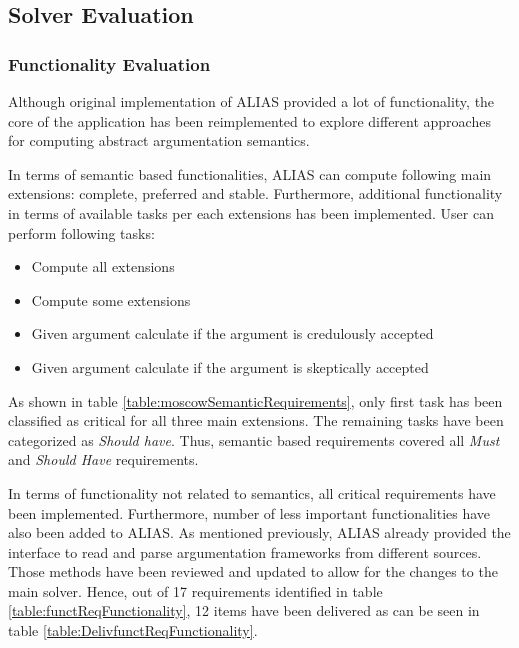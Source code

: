 \subsection{Solver Evaluation}

\subsubsection{Functionality Evaluation}
Although original implementation of ALIAS provided a lot of functionality, the core of the application has been reimplemented to explore different approaches for computing abstract argumentation semantics. 

In terms of semantic based functionalities, ALIAS can compute following main extensions: complete, preferred and stable. Furthermore, additional functionality in terms of available tasks per each extensions has been implemented. User can perform following tasks:
\begin{itemize}
	\item Compute all extensions
	\item Compute some extensions
	\item Given argument calculate if the argument is credulously accepted 
	\item Given argument calculate if the argument is skeptically accepted
\end{itemize}

As shown in table \ref{table:moscowSemanticRequirements}, only first task has been classified as critical for all three main extensions. The remaining tasks have been categorized as \textit{Should have}. Thus, semantic based requirements covered all \textit{Must} and \textit{Should Have} requirements.

In terms of functionality not related to semantics, all critical requirements have been implemented. Furthermore, number of less important functionalities have also been added to ALIAS. As mentioned previously, ALIAS already provided the interface to read and parse argumentation frameworks from different sources. Those methods have been reviewed and updated to allow for the changes to the main solver. Hence, out of 17 requirements identified in table \ref{table:functReqFunctionality}, 12 items have been delivered as can be seen in table \ref{table:DelivfunctReqFunctionality}.

